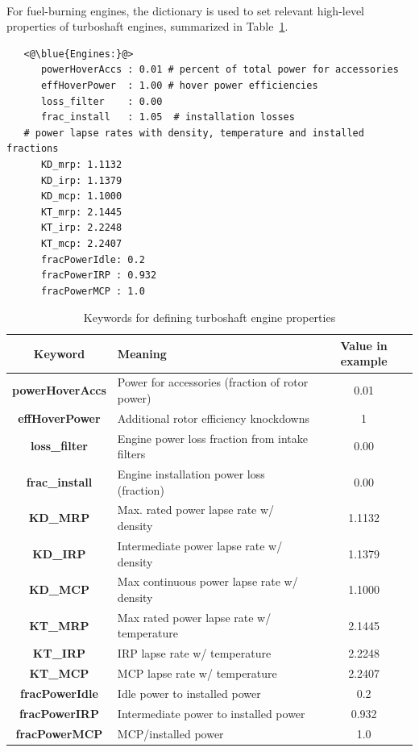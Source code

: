 \paragraph{}
For fuel-burning engines, the  dictionary is used to set relevant high-level properties of turboshaft engines, summarized in Table~\ref{tbl:turboshaft_keywords}. 
\begin{lstlisting}
   <@\blue{Engines:}@>
      powerHoverAccs : 0.01 # percent of total power for accessories
      effHoverPower  : 1.00 # hover power efficiencies
      loss_filter    : 0.00
      frac_install   : 1.05  # installation losses
   # power lapse rates with density, temperature and installed fractions
      KD_mrp: 1.1132
      KD_irp: 1.1379
      KD_mcp: 1.1000
      KT_mrp: 2.1445
      KT_irp: 2.2248
      KT_mcp: 2.2407
      fracPowerIdle: 0.2
      fracPowerIRP : 0.932
      fracPowerMCP : 1.0
\end{lstlisting}

  \begin{table}[H]
\begin{center}
	\caption{Keywords for defining turboshaft engine properties}
	\label{tbl:turboshaft_keywords}
    \begin{tabular}{| c | l | c |}
    \hline
    Keyword & Meaning & Value in example \\ 
    \hline
\textbf{powerHoverAccs} & Power for accessories (fraction of rotor power) & 0.01  \\
\textbf{effHoverPower} & Additional rotor efficiency knockdowns & 1 \\
\textbf{loss\_filter} & Engine power loss fraction from intake filters & 0.00 \\
\textbf{frac\_install} & Engine installation power loss (fraction) & 0.00 \\
\textbf{KD\_MRP} & Max. rated power lapse rate w/ density & 1.1132\\
\textbf{KD\_IRP} & Intermediate power lapse rate w/ density & 1.1379\\
\textbf{KD\_MCP} & Max continuous power lapse rate w/ density & 1.1000\\
\textbf{KT\_MRP} & Max rated power lapse rate w/ temperature & 2.1445\\
\textbf{KT\_IRP} & IRP lapse rate w/ temperature & 2.2248\\
\textbf{KT\_MCP} & MCP lapse rate w/ temperature& 2.2407\\
\textbf{fracPowerIdle} & Idle power to installed power & 0.2 \\
\textbf{fracPowerIRP} & Intermediate power to installed power & 0.932\\
\textbf{fracPowerMCP} & MCP/installed power & 1.0\\
     \hline
  \end{tabular}
\end{center}
\end{table}
\vspace{-1cm}
